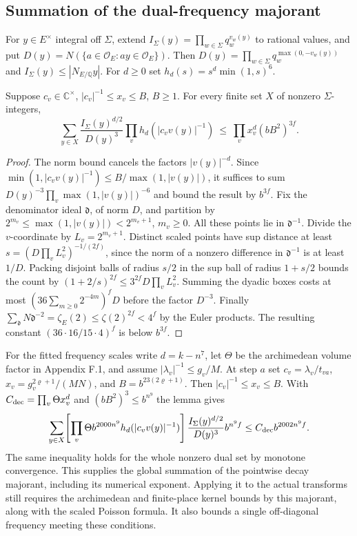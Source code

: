 \subsection*{Summation of the dual-frequency majorant}
For $y\in E^\times$ integral off $\Sigma$, extend $I_\Sigma(y)=\prod_{w\in \Sigma}q_w^{v_w(y)}$ to rational values, and put $D(y)=N(\{a\in\mathcal O_E:ay\in\mathcal O_E\})$. Then $D(y)=\prod_{w\in \Sigma}q_w^{\max(0,-v_w(y))}$ and $I_\Sigma(y)\le |N_{E/\mathbb Q}y|$. For $d\ge0$ set $h_d(s)=s^d\min(1,s)^6$.
\begin{lemma}
Suppose $c_v\in\mathbb C^\times$, $|c_v|^{-1}\le x_v\le B$, $B\ge1$. For every finite set $X$ of nonzero $\Sigma$-integers,
\[
 \sum_{y\in X}\frac{I_\Sigma(y)^{d/2}}{D(y)^3}
       \prod_v h_d(|c_vv(y)|^{-1})
 \ \le\ \prod_v x_v^d (bB^2)^{3f}.
\]
\end{lemma}
\begin{proof}
The norm bound cancels the factors $|v(y)|^{-d}$. Since $\min(1,|c_v v(y)|^{-1})\le B/\max(1,|v(y)|)$, it suffices to sum $D(y)^{-3}\prod_v\max(1,|v(y)|)^{-6}$ and bound the result by $b^{3f}$.
Fix the denominator ideal $\mathfrak d$, of norm $D$, and partition by $2^{m_v}\le\max(1,|v(y)|)<2^{m_v+1}$, $m_v\ge0$. All these points lie in $\mathfrak d^{-1}$. Divide the $v$-coordinate by $L_v=2^{m_v+1}$. Distinct scaled points have sup distance at least $s=(D\prod_v L_v^2)^{-1/(2f)}$, since the norm of a nonzero difference in $\mathfrak d^{-1}$ is at least $1/D$. Packing disjoint balls of radius $s/2$ in the sup ball of radius $1+s/2$ bounds the count by $(1+2/s)^{2f}\le 3^{2f}D\prod_v L_v^2$. Summing the dyadic boxes costs at most $(36\sum_{m\ge0}2^{-4m})^fD$ before the factor $D^{-3}$. Finally $\sum_{\mathfrak d}N\mathfrak d^{-2}=\zeta_E(2)\le\zeta(2)^{2f}<4^f$ by the Euler products. The resulting constant $(36\cdot16/15\cdot4)^f$ is below $b^{3f}$.
\end{proof}
For the fitted frequency scales write $d=k-n^7$, let $\Theta$ be the archimedean volume factor in Appendix F.1, and assume $|\lambda_v|^{-1}\le g_v/M$. At step $a$ set $c_v=\lambda_v/t_{va}$, $x_v=g_v^{2\varrho+1}/(MN)$, and $B=b^{23(2\varrho+1)}$. Then $|c_v|^{-1}\le x_v\le B$. With $C_{\rm dec}=\prod_v\Theta x_v^d$ and $(bB^2)^3\le b^{n^9}$ the lemma gives
\[
 \sum_{y\in X}\!
 \left[\prod_v\Theta b^{2000n^9} h_d(|c_vv(y)|^{-1})\right]
 \frac{I_\Sigma(y)^{d/2}}{D(y)^3} b^{n^9 f}
 \le C_{\rm dec} b^{2002n^9 f}.
\]
The same inequality holds for the whole nonzero dual set by monotone convergence. This supplies the global summation of the pointwise decay majorant, including its numerical exponent. Applying it to the actual transforms still requires the archimedean and finite-place kernel bounds by this majorant, along with the scaled Poisson formula. It also bounds a single off-diagonal frequency meeting these conditions.
